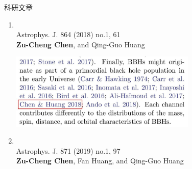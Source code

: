 \documentclass[xcolor=dvipsnames]{beamer} %
\begin{document}
\begin{frame}{科研文章}
	\vspace{-4mm}
\begin{enumerate}[<+->]
	\item {}\\
	Astrophys. J. 864 (2018) no.1, 61\\
	\textbf{Zu-Cheng Chen}, and Qing-Guo Huang\\
	\begin{center}
		\includegraphics[width=0.7\textwidth]{./pic/ligocite02.jpg}
	\end{center}

	\item {} \\
	Astrophys. J. 871 (2019) no.1, 97\\
	\textbf{Zu-Cheng Chen}, Fan Huang, and Qing-Guo Huang
\end{enumerate} 
\end{frame}
\end{document}
